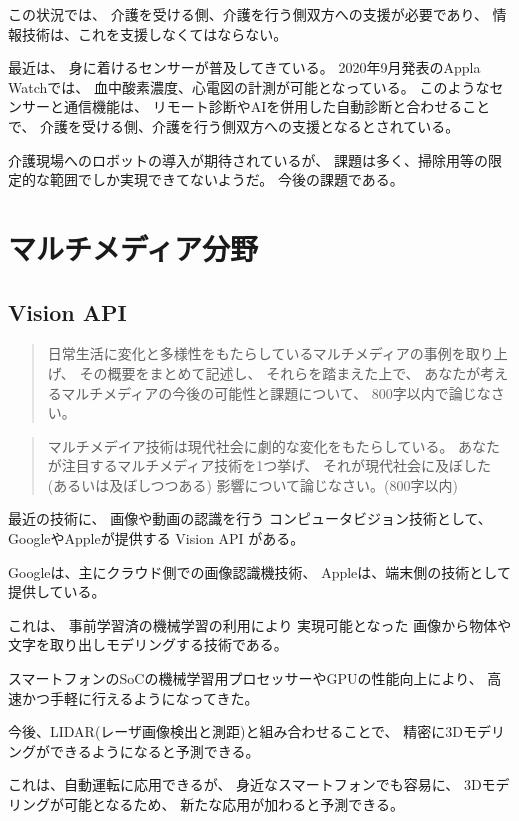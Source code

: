 \documentclass[12pt]{jsarticle}
\begin{document}
この状況では、
介護を受ける側、介護を行う側双方への支援が必要であり、
情報技術は、これを支援しなくてはならない。

最近は、
身に着けるセンサーが普及してきている。
2020年9月発表のAppla Watchでは、
血中酸素濃度、心電図の計測が可能となっている。
このようなセンサーと通信機能は、
リモート診断やAIを併用した自動診断と合わせることで、
介護を受ける側、介護を行う側双方への支援となるとされている。

介護現場へのロボットの導入が期待されているが、
課題は多く、掃除用等の限定的な範囲でしか実現できてないようだ。
今後の課題である。


\section{マルチメディア分野}

\subsection{Vision API}

\begin{quotation}
日常生活に変化と多様性をもたらしているマルチメディアの事例を取り上げ、
その概要をまとめて記述し、
それらを踏まえた上で、
あなたが考えるマルチメディアの今後の可能性と課題について、
800字以内で論じなさい。
\end{quotation}

\begin{quotation}
マルチメデイア技術は現代社会に劇的な変化をもたらしている。
あなたが注目するマルチメディア技術を1つ挙げ、
それが現代社会に及ぼした
(あるいは及ぼしつつある)
影響について論じなさい。(800字以内)
\end{quotation}

最近の技術に、
画像や動画の認識を行う
コンピュータビジョン技術として、
GoogleやAppleが提供する
Vision API
がある。

Googleは、主にクラウド側での画像認識機技術、
Appleは、端末側の技術として
提供している。

これは、
事前学習済の機械学習の利用により
実現可能となった
画像から物体や文字を取り出しモデリングする技術である。

スマートフォンのSoCの機械学習用プロセッサーやGPUの性能向上により、
高速かつ手軽に行えるようになってきた。

今後、LIDAR(レーザ画像検出と測距)と組み合わせることで、
精密に3Dモデリングができるようになると予測できる。

これは、自動運転に応用できるが、
身近なスマートフォンでも容易に、
3Dモデリングが可能となるため、
新たな応用が加わると予測できる。
\end{document}
